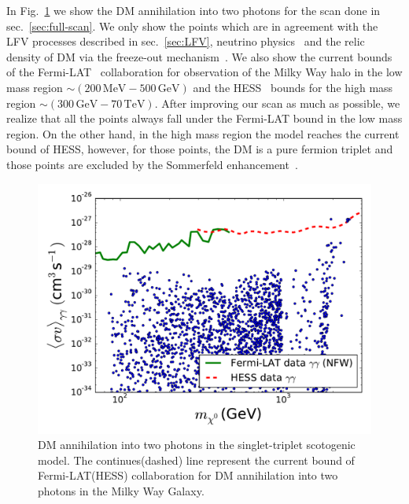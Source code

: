 \documentclass[12pt,letterpaper]{article}
\begin{document}
In Fig.~\ref{fig:sigmavgg} we show the DM annihilation into two photons for the scan done in sec.~\ref{sec:full-scan}. We only show the points which are in agreement with the LFV processes described in sec.~\ref{sec:LFV}, neutrino physics~\cite{deSalas:2017kay} and the relic density of DM via the freeze-out mechanism~\cite{Aghanim:2018eyx}.
We also show the current bounds of the Fermi-LAT~\cite{Ackermann:2015lka} collaboration for observation of the Milky Way halo in the low mass region $\sim (200\,\text{MeV}-500\,\text{GeV})$ and the HESS~\cite{Abdallah:2018qtu} bounds for the high mass region $\sim (300\,\text{GeV}-70\,\text{TeV})$.
After improving our scan as much as possible, we realize that all the points always fall under the Fermi-LAT bound in the low mass region. On the other hand, in the high mass region the model reaches the current bound of HESS, however, for those points, the DM is a pure fermion triplet and those points are excluded by the Sommerfeld enhancement~\cite{}.
 
%
\begin{figure}
\begin{center}
\includegraphics[scale=0.5]{sigmavgg_with_neutrino_physics}
\caption{DM annihilation into two photons in the singlet-triplet scotogenic model. The continues(dashed) line represent the current bound of Fermi-LAT(HESS) collaboration for DM annihilation into two photons in the Milky Way Galaxy.}
\label{fig:sigmavgg}
\end{center}
\end{figure}
%
 
 
\end{document}
